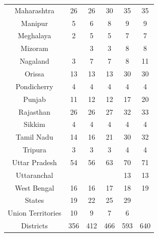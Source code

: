 \documentclass[12pt, a4paper]{article}
\begin{document}
\begin{table}[h!]
\begin{tabular}{c|ccccc}
		Maharashtra & 26 & 26 & 30 & 35 & 35 \\ 
		Manipur & 5 & 6 & 8 & 9 & 9 \\ 
		Meghalaya & 2 & 5 & 5 & 7 & 7 \\ 
		Mizoram &  & 3 & 3 & 8 & 8 \\ 
		Nagaland & 3 & 7 & 7 & 8 & 11 \\ 
		Orissa & 13 & 13 & 13 & 30 & 30 \\ 
		Pondicherry & 4 & 4 & 4 & 4 & 4 \\ 
		Punjab & 11 & 12 & 12 & 17 & 20 \\ 
		Rajasthan & 26 & 26 & 27 & 32 & 33 \\ 
		Sikkim & 4 & 4 & 4 & 4 & 4 \\ 
		Tamil Nadu & 14 & 16 & 21 & 30 & 32 \\ 
		Tripura & 3 & 3 & 3 & 4 & 4 \\ 
		Uttar Pradesh & 54 & 56 & 63 & 70 & 71 \\ 
		Uttaranchal &  &  &  & 13 & 13 \\ 
		West Bengal & 16 & 16 & 17 & 18 & 19 \\ 
		\hline
		States & 19 & 22 & 25 & 29 &  \\ 
		Union Territories & 10 & 9 & 7 & 6 &  \\ 
		Districts & 356 & 412 & 466 & 593 & 640 \\ 
		\hline
	\end{tabular}
\end{table}
\end{document}
